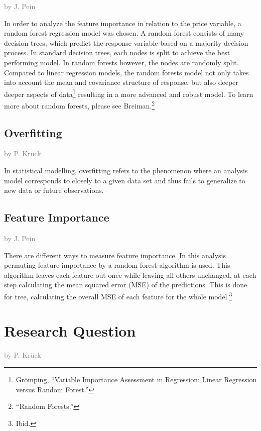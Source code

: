 \documentclass[a4paper, nobind]{templates/ociamthesis}
\begin{document}
\textcolor{gray}{by J. Pein}

In order to analyze the feature importance in relation to the price variable, a random forest regression model was chosen. A random forest consists of many decision trees, which predict the response variable based on a majority decision process. In standard decision trees, each nodes is split to achieve the best performing model. In random forests however, the nodes are randomly split. Compared to linear regression models, the random forests model not only takes into account the mean and covariance structure of response, but also deeper deeper aspects of data\footnote{Grömping, ``Variable Importance Assessment in Regression: Linear Regression versus Random Forest.''} resulting in a more advanced and robust model. To learn more about random forests, please see Breiman.\footnote{``Random Forests.''}

\hypertarget{overfitting}{%
\subsection{Overfitting}\label{overfitting}}

\textcolor{gray}{by P. Krück}

In statistical modelling, overfitting refers to the phenomenon where an analysis model corresponds to closely to a given data set and thus fails to generalize to new data or future observations.

\hypertarget{feature-importance}{%
\subsection{Feature Importance}\label{feature-importance}}

\textcolor{gray}{by J. Pein}

There are different ways to measure feature importance. In this analysis permuting feature importance by a random forest algorithm is used. This algorithm leaves each feature out once while leaving all others unchanged, at each step calculating the mean squared error (MSE) of the predictions. This is done for tree, calculating the overall MSE of each feature for the whole model.\footnote{Ibid.}

\hypertarget{research-question}{%
\section{Research Question}\label{research-question}}

\textcolor{gray}{by P. Krück}
\end{document}
